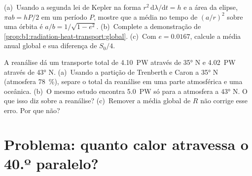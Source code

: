 \begin{exercise}[$\star\star\star$]\label{exo:b1:radiation-heat-transport:11}
(a)~Usando a segunda lei de Kepler na forma $r^2\,\mathrm d\lambda/\mathrm dt = h$ e a área da
elipse, $\pi a b = hP/2$ em um período $P$, mostre que a média no tempo de $(a/r)^2$ sobre uma
órbita é $a/b = 1/\sqrt{1 - e^2}$. (b)~Complete a demonstração de
\cref{prop:b1:radiation-heat-transport:global}. (c)~Com $e = 0.0167$, calcule a média anual global e
sua diferença de $S_0/4$.
\end{exercise}

\begin{exercise}[$\star\star\star$]\label{exo:b1:radiation-heat-transport:12}
A reanálise dá um transporte total de \qty{4.10}{PW} através de \ang{35} N e \qty{4.02}{PW} através
de \ang{43} N. (a)~Usando a partição de Trenberth e Caron a \ang{35} N (atmosfera \qty{78}{\percent}),
separe o total da reanálise em uma parte atmosférica e uma oceânica. (b)~O mesmo estudo encontra
\qty{5.0}{PW} só para a atmosfera a \ang{43} N. O que isso diz sobre a reanálise? (c)~Remover a
média global de $R$ não corrige esse erro. Por que não?
\end{exercise}

\section{Problema: quanto calor atravessa o 40.º paralelo?}

